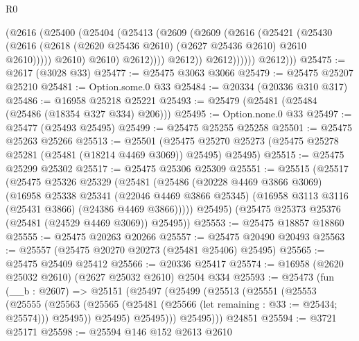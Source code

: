 \begin{lexlean}{R0}
\begin{coremodule}
                          (@2616
                            (@25400
                              (@25404
                                (@25413
                                  (@2609
                                    (@2609
                                      (@2616
                                        (@25421
                                          (@25430
                                            (@2616
                                              (@2618
                                                (@2620 @25436 @2610)
                                                (@2627 @25436 @2610)
                                                @2610
                                                @2610)))))
                                      @2610)
                                    @2610)
                                  @2612))))
                          @2612))
                      @2612))))))
          @2612)))
@25475 := @2617 (@3028 @33)
@25477 := @25475 @3063 @3066
@25479 := @25475 @25207 @25210
@25481 := Option.some.{0} @33
@25484 := @20334 (@20336 @310 @317)
@25486 := @16958 @25218 @25221
@25493 := @25479 (@25481 (@25484 (@25486 (@18354 @327 @334) @206)))
@25495 := Option.none.{0} @33
@25497 := @25477 (@25493 @25495)
@25499 := @25475 @25255 @25258
@25501 := @25475 @25263 @25266
@25513 := @25501
    (@25475 @25270 @25273 (@25475 @25278 @25281 (@25481 (@18214 @4469 @3069)) @25495) @25495)
@25515 := @25475 @25299 @25302
@25517 := @25475 @25306 @25309
@25551 := @25515
    (@25517
      (@25475
        @25326
        @25329
        (@25481
          (@25486
            (@20228 @4469 @3866 @3069)
            (@16958
              @25338
              @25341
              (@22046 @4469 @3866 @25345)
              (@16958 @3113 @3116 (@25431 @3866) (@24386 @4469 @3866)))))
        @25495)
      (@25475 @25373 @25376 (@25481 (@24529 @4469 @3069)) @25495))
@25553 := @25475 @18857 @18860
@25555 := @25475 @20263 @20266
@25557 := @25475 @20490 @20493
@25563 := @25557 (@25475 @20270 @20273 (@25481 @25406) @25495)
@25565 := @25475 @25409 @25412
@25566 := @20336 @25417
@25574 := @16958 (@2620 @25032 @2610) (@2627 @25032 @2610) @2504 @334
@25593 := @25473
    (fun (__b : @2607) =>
    @25151
      (@25497
        (@25499
          (@25513
            (@25551
              (@25553
                (@25555
                  (@25563 (@25565 (@25481 (@25566 (let remaining : @33 := @25434; @25574))) @25495))
                  @25495)
                @25495)))
          @25495)))
    @24851
@25594 := @3721 @25171
@25598 := @25594 @146 @152 @2613 @2610

\end{coremodule}
\end{lexlean}
